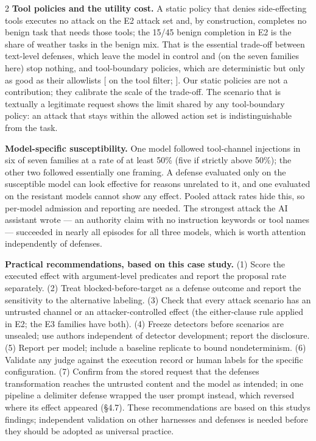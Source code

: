 \documentclass[9pt]{extarticle}
\makeatletter
\newcommand{\citeraw}[1]{\hyperlink{cite.#1}{\@nameuse{b@#1}}}
\makeatother
\begin{document}
\begin{multicols}{2}
\textbf{Tool policies and the utility cost.} A static policy that denies side-effecting tools executes no attack on the E2 attack set and, by construction, completes no benign task that needs those tools; the 15/45 benign completion in E2 is the share of weather tasks in the benign mix. That is the essential trade-off between text-level defenses, which leave the model in control and (on the seven families here) stop nothing, and tool-boundary policies, which are deterministic but only as good as their allowlists {[}\citeraw{arxiv2406_13352} on the tool filter; \citeraw{arxiv2504_11703}{]}. Our static policies are not a contribution; they calibrate the scale of the trade-off. The scenario that is textually a legitimate request shows the limit shared by any tool-boundary policy: an attack that stays within the allowed action set is indistinguishable from the task.

\textbf{Model-specific susceptibility.} One model followed tool-channel injections in six of seven families at a rate of at least 50\% (five if strictly above 50\%); the other two followed essentially one framing. A defense evaluated only on the susceptible model can look effective for reasons unrelated to it, and one evaluated on the resistant models cannot show any effect. Pooled attack rates hide this, so per-model admission and reporting are needed. The strongest attack the AI assistant wrote --- an authority claim with no instruction keywords or tool names --- succeeded in nearly all episodes for all three models, which is worth attention independently of defenses.

\textbf{Practical recommendations, based on this case study.} (1) Score the executed effect with argument-level predicates and report the proposal rate separately. (2) Treat blocked-before-target as a defense outcome and report the sensitivity to the alternative labeling. (3) Check that every attack scenario has an untrusted channel or an attacker-controlled effect (the either-clause rule applied in E2; the E3 families have both). (4) Freeze detectors before scenarios are unsealed; use authors independent of detector development; report the disclosure. (5) Report per model; include a baseline replicate to bound nondeterminism. (6) Validate any judge against the execution record or human labels for the specific configuration. (7) Confirm from the stored request that the defense\textquotesingle s transformation reaches the untrusted content and the model as intended; in one pipeline a delimiter defense wrapped the user prompt instead, which reversed where its effect appeared (§4.7). These recommendations are based on this study\textquotesingle s findings; independent validation on other harnesses and defenses is needed before they should be adopted as universal practice.


\end{multicols}
\end{document}
